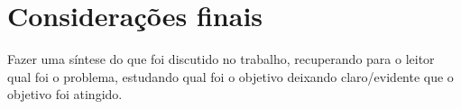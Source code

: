 \section{Considerações finais}

    Fazer uma síntese do que foi discutido no trabalho, recuperando para o leitor qual
    foi o problema, estudando qual foi o objetivo deixando claro/evidente que o objetivo
    foi atingido.

\postextual